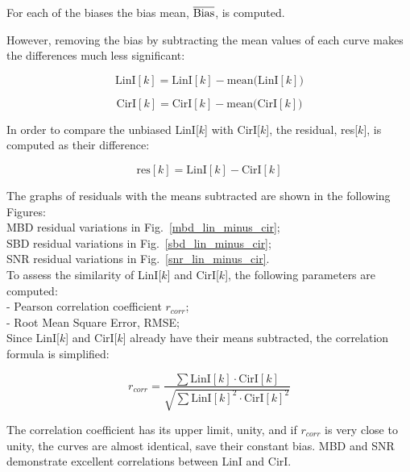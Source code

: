 \documentclass[letterpaper,twoside,12pt]{article}
\begin{document}
For each of the biases the bias mean, $\overline{\rm Bias}$, is computed.

However, removing the bias by subtracting the mean values of each curve makes the differences much less significant:

\begin{equation}
  \label{subtr_mean_lin}
  \mathrm{LinI}[k] = \mathrm{LinI}[k] - \mathrm{mean(LinI}[k])
\end{equation}

\begin{equation}
  \label{subtr_mean_cir}
  \mathrm{CirI}[k] = \mathrm{CirI}[k] - \mathrm{mean(CirI}[k])
\end{equation}

\noindent In order to compare the unbiased LinI[$k$] with CirI[$k$], the residual, res[$k$], is computed as their difference:

\begin{equation}
  \label{resid}
  \mathrm{res}[k] = \mathrm{LinI}[k] - \mathrm{CirI}[k] 
\end{equation}

\noindent The graphs of residuals with the means subtracted are shown in the following Figures: \\

\indent MBD residual variations in Fig.~\ref{mbd_lin_minus_cir};  \\
\indent SBD residual variations in Fig.~\ref{sbd_lin_minus_cir};  \\
\indent SNR residual variations in Fig.~\ref{snr_lin_minus_cir}.  \\

To assess the similarity of LinI[$k$] and CirI[$k$], the following parameters are computed: \\

\noindent - Pearson correlation coefficient $r_{corr}$; \\
\noindent - Root Mean Square Error, RMSE; \\

Since LinI[$k$] and CirI[$k$] already have their means subtracted, the correlation formula is simplified:

\begin{equation}
  \label{corr}
  r_{corr} = \frac{\sum \mathrm{LinI}[k] \cdot \mathrm{CirI}[k]}{\sqrt{\sum \mathrm{LinI}[k]^2 \cdot 
                   \mathrm{CirI}[k]^2}}
\end{equation}

The correlation coefficient has its upper limit, unity, and if $r_{corr}$ is very close to unity, the curves are almost identical, save their constant bias. MBD and SNR demonstrate excellent correlations between LinI and CirI.
\end{document}

